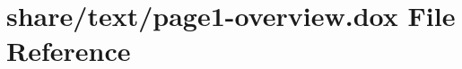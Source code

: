 \hypertarget{page1-overview_8dox}{}\section{share/text/page1-\/overview.dox File Reference}
\label{page1-overview_8dox}
